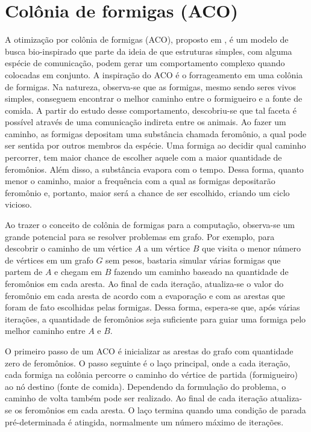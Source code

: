 \section{Colônia de formigas (ACO)}
\label{section_aco}
A otimização por colônia de formigas (ACO), proposto em \cite{Dorigo1996}, é um modelo de busca bio-inspirado que parte da ideia de que estruturas simples, com alguma espécie de comunicação, podem gerar um comportamento complexo quando colocadas em conjunto. A inspiração do ACO é o forrageamento em uma colônia de formigas. Na natureza, observa-se que as formigas, mesmo sendo seres vivos simples, conseguem encontrar o melhor caminho entre o formigueiro e a fonte de comida. A partir do estudo desse comportamento, descobriu-se que tal faceta é possível através de uma comunicação indireta entre os animais. Ao fazer um caminho, as formigas depositam uma substância chamada feromônio, a qual pode ser sentida por outros membros da espécie. Uma formiga ao decidir qual caminho percorrer, tem maior chance de escolher aquele com a maior quantidade de feromônios. Além disso, a substância evapora com o tempo. Dessa forma, quanto menor o caminho, maior a frequência com a qual as formigas depositarão feromônio e, portanto, maior será a chance de ser escolhido, criando um ciclo vicioso.

Ao trazer o conceito de colônia de formigas para a computação, observa-se um grande potencial para se resolver problemas em grafo. Por exemplo, para descobrir o caminho de um vértice $A$ a um vértice $B$ que visita o menor número de vértices em um grafo $G$ sem pesos, bastaria simular várias formigas que partem de $A$ e chegam em $B$ fazendo um caminho baseado na quantidade de feromônios em cada aresta. Ao final de cada iteração, atualiza-se o valor do feromônio em cada aresta de acordo com a evaporação e com as arestas que foram de fato escolhidas pelas formigas. Dessa forma, espera-se que, após várias iterações, a quantidade de feromônios seja suficiente para guiar uma formiga pelo melhor caminho entre $A$ e $B$.

O primeiro passo de um ACO é inicializar as arestas do grafo com quantidade zero de feromônios. O passo seguinte é o laço principal, onde a cada iteração, cada formiga na colônia percorre o caminho do vértice de partida (formigueiro) ao nó destino (fonte de comida). Dependendo da formulação do problema, o caminho de volta também pode ser realizado. Ao final de cada iteração atualiza-se os feromônios em cada aresta. O laço termina quando uma condição de parada pré-determinada é atingida, normalmente um número máximo de iterações.

